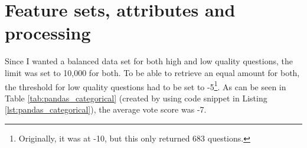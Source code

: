 \section{Feature sets, attributes and processing}
\label{sec:feature_sets}
Since I wanted a balanced data set for both high and low quality questions, the limit was set to 10,000 for both.
To be able to retrieve an equal amount for both, the threshold for low quality questions had to be set to -5\footnote{
	Originally, it was at -10, but this only returned 683 questions. 
}.
As can be seen in Table \ref{tab:pandas_categorical} (created by using code snippet in Listing \ref{lst:pandas_categorical}), the average vote score was -7.

\begin{comment}
When retrieving the questions from the database, the vote score was set to less than -10 for bad question and greater than 50 for good questions (retrieval limit set to 10,000; 20,000 total). 
However, the vote score was set too low for the bad questions, since only 683 rows was returned. 
Therefore, the score was then set to less than -5. 
What was also found when using pandas.Categorical to get an overview (code snippet in Listing \ref{lst:pandas_categorical} and result in Table \ref{tab:pandas_categorical}), 
one can see that for the 10,000 bad questions, the average vote score was -7. This could be an indicator that when a question has a vote score below -5, they are ignored.
\end{comment}

